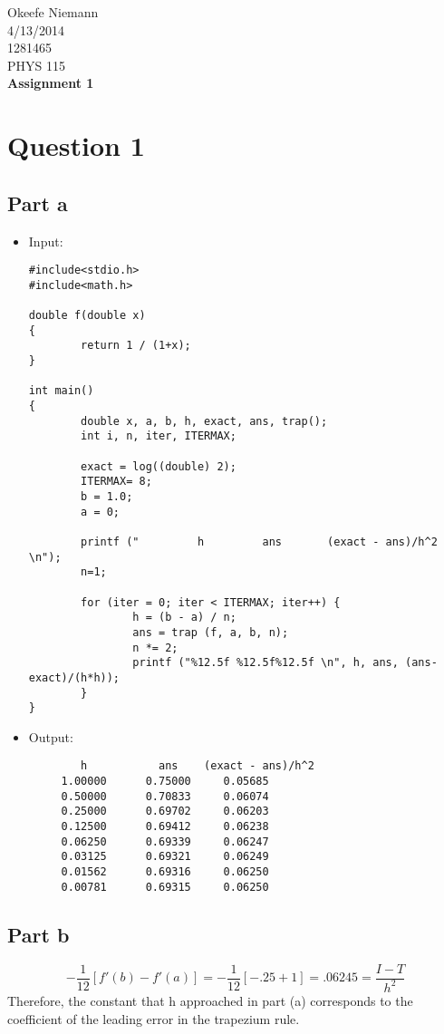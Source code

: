 \documentclass[10pt]{article}
\begin{document}
 
\begin{center}
\large
\hfill Okeefe Niemann\\
\hfill 4/13/2014\\
\hfill 1281465\\
\hfill PHYS 115 \\
\LARGE \textbf{Assignment 1}\\
\end{center}
\normalsize
\section{Question 1}
\subsection{Part a}

\begin{itemize}
\item Input:
\begin{verbatim}
#include<stdio.h>
#include<math.h>

double f(double x)
{
        return 1 / (1+x);
}

int main()
{
        double x, a, b, h, exact, ans, trap();
        int i, n, iter, ITERMAX;
        
        exact = log((double) 2);
        ITERMAX= 8;
        b = 1.0;
        a = 0;
        
        printf ("         h         ans       (exact - ans)/h^2 \n");
        n=1;

        for (iter = 0; iter < ITERMAX; iter++) {
                h = (b - a) / n;
                ans = trap (f, a, b, n);
                n *= 2;
                printf ("%12.5f %12.5f%12.5f \n", h, ans, (ans-exact)/(h*h));
        }
}
\end{verbatim}
\item Output:
\begin{verbatim}
        h           ans    (exact - ans)/h^2 
     1.00000      0.75000     0.05685 
     0.50000      0.70833     0.06074 
     0.25000      0.69702     0.06203 
     0.12500      0.69412     0.06238 
     0.06250      0.69339     0.06247 
     0.03125      0.69321     0.06249 
     0.01562      0.69316     0.06250 
     0.00781      0.69315     0.06250 
\end{verbatim}
\end{itemize}

\subsection{Part b}
$$-\frac{1}{12} [f'(b) - f'(a)] = -\frac{1}{12} [-.25 + 1] = .06245 = \frac{I - T}{h^2}$$
Therefore, the constant that h approached in part (a) corresponds to the coefficient of the leading error in the trapezium rule.
\end{document}

